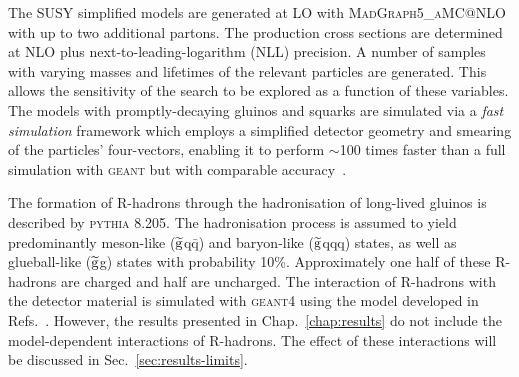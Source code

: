 The SUSY %
simplified models are generated at LO with \textsc{MadGraph5\_aMC@NLO} with 
up to two additional partons. The production cross sections are determined at 
NLO plus next-to-leading-logarithm (NLL) precision. A number of samples 
with varying masses and lifetimes of the relevant particles are generated. 
This allows the sensitivity of the search to be explored as a function of 
these variables.
The models with promptly-decaying gluinos and squarks are simulated via a 
\textit{fast simulation} framework which employs a simplified detector geometry 
and smearing of the particles' four-vectors, enabling it to perform $\sim$100 
times faster than a full simulation with \textsc{geant} but with comparable 
accuracy~\cite{fastsim}.


The formation of R-hadrons through the hadronisation of long-lived gluinos is 
described by \textsc{pythia 8.205}. The hadronisation process is assumed to 
yield predominantly 
meson-like ($\mathrm{\widetilde{g}}$q$\bar{\mathrm q}$) and baryon-like ($\mathrm{\widetilde{g}}$qqq) states, 
as well as glueball-like ($\mathrm{\widetilde{g}}$g) states with probability 10\%. 
Approximately one half of these R-hadrons are charged and half are uncharged. 
The interaction of R-hadrons with the detector material is simulated with 
\textsc{geant4} using the model developed in 
Refs.~\cite{cloudmodel1,cloudmodel2}. 
However, the results presented in Chap.~\ref{chap:results} do not include the 
model-dependent interactions of R-hadrons. The effect of these interactions 
will be discussed in Sec.~\ref{sec:results-limits}.


